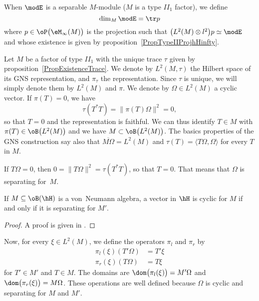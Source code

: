 When $\modE$ is a separable $M$-module ($M$ is a type $II_1$ factor), we define
\begin{equation}
	\dim_M\modE=\tr p
\end{equation}
where $p\in\oP\big( \eM_{\infty}(M) \big)$ is the projection such that $\big( L^2(M)\otimes l^2 \big)p\simeq \modE$ and whose existence is given by proposition~\ref{PropTypeIIProjhHinfty}.

Let $M$ be a factor of type $II_1$ with the unique trace $\tau$ given by proposition~\ref{PropExistenceTrace}. We denote by $L^2(M,\tau)$ the Hilbert space of its GNS representation, and $\pi_{\tau}$ the representation. Since $\tau$ is unique, we will simply denote them by $L^2(M)$ and $\pi$. We denote by $\Omega\in L^2(M)$ a cyclic vector. If $\pi(T)=0$, we have
\[
	\tau(T^*T)=\| \pi(T)\Omega \|^2=0,
\]
so that $T=0$ and the representation is faithful. We can thus identify $T\in M$ with $\pi(T)\in \oB\big( L^2(M) \big)$ and we have $M\subset\oB\big( L^2(M) \big)$. The basics properties of the GNS construction say also that $\overline{ M\Omega }=L^2(M)$ and $\tau(T)=\langle T\Omega, \Omega\rangle $ for every $T$ in $M$.

If $T\Omega=0$, then $0=\| T\Omega \|^2=\tau(T^*T)$, so that $T=0$. That means that $\Omega$ is separating for~$M$.

\begin{lemma}
If $M\subseteq\oB(\hH)$ is a von~Neumann algebra, a vector in $\hH$ is cyclic for $M$ if and only if it is separating for $M'$.
\end{lemma}
\begin{proof}
A proof is given in \cite{JonesSunder}.
\end{proof}

Now, for every $\xi\in L^2(M)$, we define the operators $\pi_l$ and $\pi_r$ by
\begin{subequations}
\begin{align}
	\pi_l(\xi)(T'\Omega)&= T'\xi\\
	\pi_r(\xi)(T\Omega) &= T\xi
\end{align}
\end{subequations}
for $T'\in M'$ and $T\in M$. The domains are $\dom\big( \pi_l(\xi) \big)=M'\Omega$ and $\dom\big( \pi_r(\xi) \big)=M\Omega$. These operations are well defined because $\Omega$ is cyclic and separating for $M$ and $M'$.

